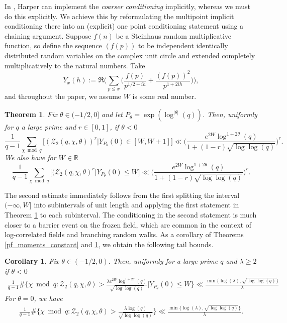 \documentclass[reqno]{amsart}
\newtheorem{theorem}{Theorem}
\theoremstyle{definition}
\newtheorem{corollary}{Corollary}
\theoremstyle{remark}
\numberwithin{equation}{section}
\theoremstyle{remark}
\begin{document}
In \cite{harper2023typicalsizecharacterzeta}, Harper can implement the \textit{coarser conditioning} implicitly, whereas we must do this explicitly. We achieve this by reformulating the multipoint implicit conditioning there into an (explicit) one point conditioning statement using a chaining argument. Suppose $f(n)$ be a Steinhaus random multiplicative function, so define the sequence $(f(p))$ to be independent identically distributed random variables on the complex unit circle and extended completely multiplicatively to the natural numbers. Take
\begin{equation} \label{short_lognormal}
        Y_x(h) := \Re \big(\sum_{p \leq x}\big(\frac{f(p)}{p^{1/2+ih}}+\frac{(f(p))^2}{p^{1+2ih}}\big)\big),
\end{equation}
and throughout the paper, we assume $W$ is some real number.
\begin{theorem}\label{pf_moments_meso}
    Fix $\theta \in (-1/2,0]$ and let $P_\theta = \exp(\log^{|\theta|}(q))$. Then, uniformly for $q$ a large prime and $r \in [0,1]$, if $\theta <0$
    \begin{equation*}
        \frac{1}{q-1}\sum_{\chi \bmod{q}}\big[(\mathcal{Z}_2(q,\chi,\theta))^r\big|Y_{P_\theta}(0) \in [W,W+1]\big] \ll \big(\frac{e^{2W}\log^{1+2\theta}(q)}{1+(1-r)\sqrt{\log\log(q)}}\big)^r.
    \end{equation*}
    We also have for $W \in \mathbb{R}$
    \begin{equation*}
        \frac{1}{q-1}\sum_{\chi \bmod{q}}\big[(\mathcal{Z}_2(q,\chi,\theta)^r\big|Y_{P_\theta}(0) \leq W\big] \ll \big(\frac{e^{2W}\log^{1+2\theta}(q)}{1+(1-r)\sqrt{\log\log(q)}}\big)^r.
    \end{equation*}
\end{theorem}
The second estimate immediately follows from the first splitting the interval $(-\infty,W]$ into subintervals of unit length and applying the first statement in Theorem \ref{pf_moments_meso} to each subinterval. The conditioning in the second statement is much closer to a barrier event on the frozen field, which are common in the context of log-correlated fields and branching random walks. As a corollary of Theorems \ref{pf_moments_constant} and \ref{pf_moments_meso}, we obtain the following tail bounds.
\begin{corollary} \label{typical_partition_size}
    \textit{Fix $\theta \in (-1/2,0)$. Then, uniformly for a large prime $q$ and $\lambda \geq 2$ if $\theta <0$}
     \begin{align*}
        \frac{1}{q-1}\#\big\{\chi \bmod{q}:\mathcal{Z}_2(q,\chi,\theta) > \frac{\lambda e^{2W} \log^{1+2\theta}(q)}{\sqrt{\log\log(q)}} \big| Y_{P_\theta}(0) \leq W\big\} 
        \ll \frac{\min\{\log(\lambda),\sqrt{\log\log(q)}\}}{\lambda}
    \end{align*}
    \textit{For $\theta=0$, we have}
    \begin{align*}
        \frac{1}{q-1}\#\big\{\chi \bmod{q}:\mathcal{Z}_2(q,\chi,\theta) > \frac{\lambda \log(q)}{\sqrt{\log\log(q)}}\big\} 
        \ll \frac{\min\{\log(\lambda),\sqrt{\log\log(q)}\}}{\lambda}.
    \end{align*}
\end{corollary}
\end{document}
